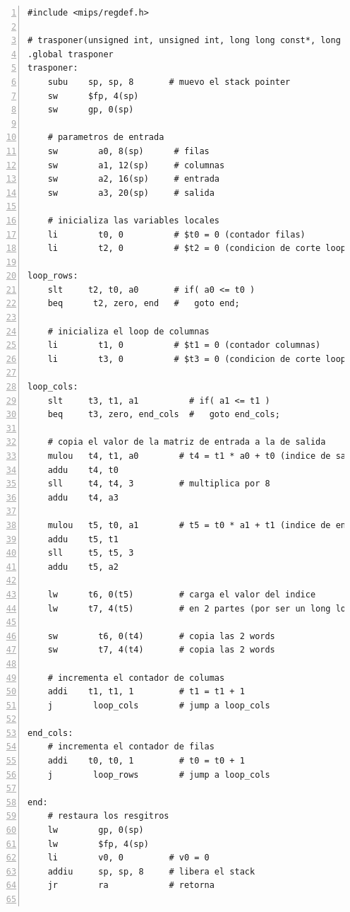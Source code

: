 \documentclass[11pt,a4paper]{article}
\begin{document}
\begin{lstlisting}[numbers=left, tabsize=2, basicstyle=\fontsize{11}{13}\ttfamily, frame=single, caption={matrix method (asm}]
#include <mips/regdef.h>

# trasponer(unsigned int, unsigned int, long long const*, long long*):
.global trasponer
trasponer:
    subu    sp, sp, 8       # muevo el stack pointer
    sw      $fp, 4(sp)
    sw      gp, 0(sp)

    # parametros de entrada
    sw        a0, 8(sp)      # filas
    sw        a1, 12(sp)     # columnas
    sw        a2, 16(sp)     # entrada
    sw        a3, 20(sp)     # salida

    # inicializa las variables locales
    li        t0, 0          # $t0 = 0 (contador filas)
    li        t2, 0          # $t2 = 0 (condicion de corte loop filas)

loop_rows:
    slt     t2, t0, a0       # if( a0 <= t0 )
    beq      t2, zero, end   #   goto end;

    # inicializa el loop de columnas
    li        t1, 0          # $t1 = 0 (contador columnas)
    li        t3, 0          # $t3 = 0 (condicion de corte loop columnas)

loop_cols:
    slt     t3, t1, a1          # if( a1 <= t1 )
    beq     t3, zero, end_cols  #   goto end_cols;

    # copia el valor de la matriz de entrada a la de salida
    mulou   t4, t1, a0        # t4 = t1 * a0 + t0 (indice de salida)
    addu    t4, t0
    sll     t4, t4, 3         # multiplica por 8
    addu    t4, a3

    mulou   t5, t0, a1        # t5 = t0 * a1 + t1 (indice de entrada)
    addu    t5, t1
    sll     t5, t5, 3
    addu    t5, a2

    lw      t6, 0(t5)         # carga el valor del indice
    lw      t7, 4(t5)         # en 2 partes (por ser un long long)

    sw        t6, 0(t4)       # copia las 2 words
    sw        t7, 4(t4)       # copia las 2 words

    # incrementa el contador de columas
    addi    t1, t1, 1         # t1 = t1 + 1
    j        loop_cols        # jump a loop_cols

end_cols:
    # incrementa el contador de filas
    addi    t0, t0, 1         # t0 = t0 + 1
    j        loop_rows        # jump a loop_cols

end:
    # restaura los resgitros
    lw        gp, 0(sp)
    lw        $fp, 4(sp)
    li        v0, 0         # v0 = 0
    addiu     sp, sp, 8     # libera el stack
    jr        ra            # retorna


\end{lstlisting}
\end{document}
